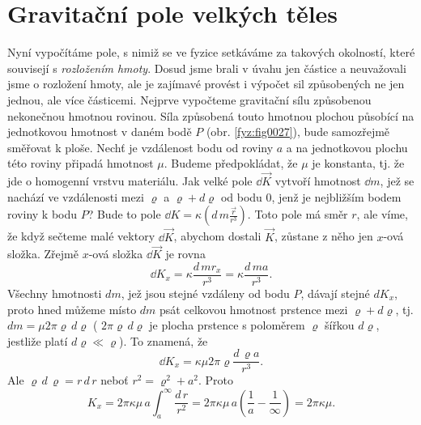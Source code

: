    
  \section{Gravitační pole velkých těles}
    Nyní vypočítáme pole, s nimiž se ve fyzice setkáváme za takových okolností, které souvisejí s 
    \emph{rozložením hmoty}. Dosud jsme brali v úvahu jen částice a neuvažovali jsme o rozložení 
    hmoty, ale je zajímavé provést i výpočet sil způsobených ne jen jednou, ale více částicemi. 
    Nejprve vypočteme gravitační sílu způsobenou nekonečnou hmotnou rovinou. Síla způsobená touto 
    hmotnou plochou působící na jednotkovou hmotnost v daném bodě \(P\) (obr. \ref{fyz:fig0027}), 
    bude samozřejmě směřovat k ploše. Nechť je vzdálenost bodu od roviny \(a\) a na jednotkovou 
    plochu této roviny připadá hmotnost \(\mu\). Budeme předpokládat, že \(\mu\) je konstanta, tj. 
    že jde o homogenní vrstvu materiálu. Jak velké pole \(\dd{\vec{K}}\) vytvoří hmotnost 
    \(\dd{m}\), jež se nachází ve vzdálenosti mezi \(\varrho\) a \(\varrho +d\varrho\) od bodu 
    \(0\), jenž je nejbližším bodem roviny k bodu \(P\)? Bude to pole \(\dd{K} = 
    \kappa(d\,m\frac{\vec{r}}{r^3})\). Toto pole má směr \(r\), ale víme, že když sečteme malé 
    vektory \(\dd{\vec{K}}\), abychom dostali \(\vec{K}\), zůstane z něho jen \(x\)-ová složka. 
    Zřejmě \(x\)-ová složka \(\dd{\vec{K}}\) je rovna
    \begin{equation}\label{fyz:eq046}
      \dd{K_x} = \kappa\frac{d\,mr_x}{r^3} = \kappa\frac{d\,ma}{r^3}.
    \end{equation}
    Všechny hmotnosti \(dm\), jež jsou stejné vzdáleny od bodu \(P\), dávají stejné \(dK_x\), proto 
    hned můžeme místo \(dm\) psát celkovou hmotnost prstence mezi \(\varrho +d\varrho\), tj. 
    \(dm=\mu2\pi\varrho\,d\varrho\) ( \(2\pi\varrho\,d\varrho\) je plocha prstence s poloměrem 
    \(\varrho\) šířkou \(d\varrho\), jestliže platí \(d\varrho \ll \varrho\)). To znamená, že
    \begin{equation}\label{fyz:eq047}
      \dd{K_x} = \kappa\mu2\pi\varrho\frac{d\,\varrho a}{r^3}.
    \end{equation}
    Ale \(\varrho\,d\,\varrho = r\,d\,r\) neboť \(r^2 = \varrho^2 + a^2\). Proto
    \begin{equation}\label{fyz:eq048}
      K_x = 2\pi\kappa\mu\,a\int_a^\infty\frac{d\,r}{r^2}
          = 2\pi\kappa\mu\,a\left(\frac{1}{a} - \frac{1}{\infty}\right) = 2\pi\kappa\mu.
    \end{equation}

